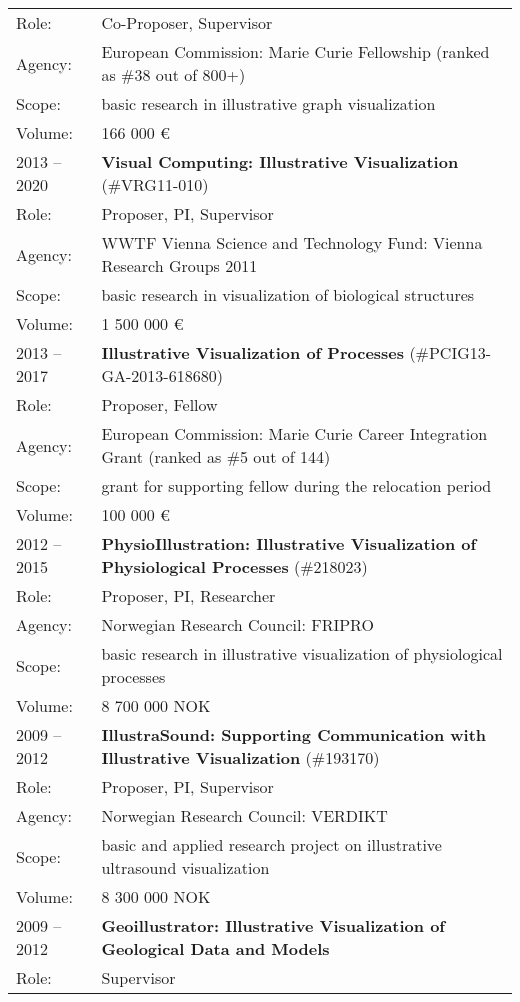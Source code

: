 \documentclass[a4paper,11pt]{letter}
\begin{document}
\begin{tabular}{l| l}
Role: & Co-Proposer, Supervisor \\
Agency: & European Commission: Marie Curie Fellowship (ranked as \#38 out of 800+) \\
Scope: & basic research in illustrative graph visualization \\
Volume: & 166 000 \euro{} \\
\hline
2013 -- 2020 & \textbf{Visual Computing: Illustrative Visualization} (\#VRG11-010) \\
Role: & Proposer, PI, Supervisor \\
Agency: & WWTF Vienna Science and Technology Fund: Vienna Research Groups 2011\\
Scope: & basic research in visualization of biological structures \\
Volume: & 1 500 000 \euro{} \\
\hline
2013 -- 2017 & \textbf{Illustrative Visualization of Processes} (\#PCIG13-GA-2013-618680) \\
Role: & Proposer, Fellow \\
Agency: & European Commission: Marie Curie Career Integration Grant (ranked as \#5 out of 144) \\
Scope: & grant for supporting fellow during the relocation period \\
Volume: & 100 000 \euro{} \\
\hline
2012 -- 2015 & \textbf{PhysioIllustration: Illustrative Visualization of Physiological Processes} (\#218023) \\
Role: & Proposer, PI, Researcher \\
Agency: & Norwegian Research Council: FRIPRO \\
Scope: & basic research in illustrative visualization of physiological processes \\
Volume: & 8 700 000 NOK \\
\hline
2009 -- 2012 & \textbf{IllustraSound: Supporting Communication with Illustrative Visualization} (\#193170) \\
Role: & Proposer, PI, Supervisor \\
Agency: & Norwegian Research Council: VERDIKT \\
Scope: & basic and applied research project on illustrative ultrasound visualization \\
Volume: & 8 300 000 NOK \\
\hline
2009 -- 2012 & \textbf{Geoillustrator: Illustrative Visualization of Geological Data and Models}  \\
Role: & Supervisor \\

\end{tabular}
\end{document}
